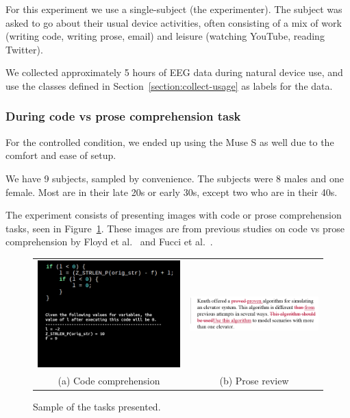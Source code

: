             For this experiment we use a single-subject (the experimenter). The subject was asked to go about their usual device activities, often consisting of a mix of work (writing code, writing prose, email) and leisure (watching YouTube, reading Twitter).
            
            We collected approximately 5 hours of EEG data during natural device use, and use the classes defined in Section~\ref{section:collect-usage} as labels for the data.

        \subsubsection*{During code vs prose comprehension task}

            For the controlled condition, we ended up using the Muse S as well due to the comfort and ease of setup.

            We have 9 subjects, sampled by convenience. The subjects were 8 males and one female. Most are in their late 20s or early 30s, except two who are in their 40s.

            The experiment consists of presenting images with code or prose comprehension tasks, seen in Figure~\ref{fig:tasks}. These images are from previous studies on code vs prose comprehension by Floyd et al.~\cite{floyd_decoding_2017} and Fucci et al.~\cite{fucci_replication_2019}. 


            \begin{figure}[H]
                \centering
                \begin{tabular}{cc}
                    \includegraphics[trim=25 160 0 0,clip,width=75mm]{img/final-1-1.png}
                    &
                    \includegraphics[trim=20 0 20 0,clip,width=75mm]{img/bugs_1.PNG}
                    \\
                    (a) Code comprehension
                    &
                    (b) Prose review
                \end{tabular}
                \caption{Sample of the tasks presented.}\label{fig:tasks}
            \end{figure}

